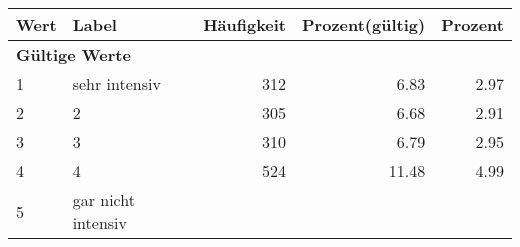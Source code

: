      \begin{longtable}{lXrrr}
     \toprule
     \textbf{Wert} & \textbf{Label} & \textbf{Häufigkeit} & \textbf{Prozent(gültig)} & \textbf{Prozent} \\
     \endhead
     \midrule
     \multicolumn{5}{l}{\textbf{Gültige Werte}}\\

     1 &
     \multicolumn{1}{X}{ sehr intensiv   } &


       \num{312} &
       \num[round-mode=places,round-precision=2]{6,83} &
         \num[round-mode=places,round-precision=2]{2,97} \\

     2 &
     \multicolumn{1}{X}{ 2   } &


       \num{305} &
       \num[round-mode=places,round-precision=2]{6,68} &
         \num[round-mode=places,round-precision=2]{2,91} \\

     3 &
     \multicolumn{1}{X}{ 3   } &


       \num{310} &
       \num[round-mode=places,round-precision=2]{6,79} &
         \num[round-mode=places,round-precision=2]{2,95} \\

     4 &
     \multicolumn{1}{X}{ 4   } &


       \num{524} &
       \num[round-mode=places,round-precision=2]{11,48} &
         \num[round-mode=places,round-precision=2]{4,99} \\

     5 &
     \multicolumn{1}{X}{ gar nicht intensiv   } &



\end{longtable}

